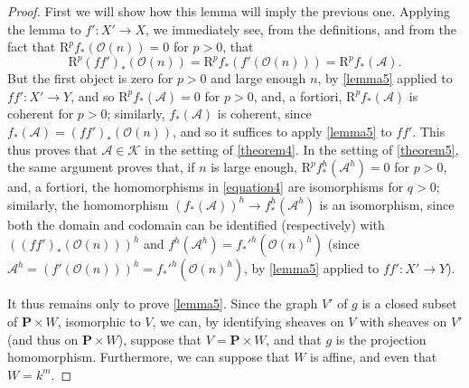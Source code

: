 \documentclass{article}
\theoremstyle{plain}
\theoremstyle{definition}
\newcommand{\sh}{\mathscr}
\newcommand{\cat}{\mathcal}
\newcommand{\RR}{\mathrm{R}}
\newcommand{\oldpage}[1]{\marginpar{\footnotesize$\Big\vert$ \textit{p.~#1}}}
\begin{document}
\begin{proof}
  First we will show how this lemma will imply the previous one.
  Applying the lemma to $f'\colon X'\to X$, we immediately see, from the definitions, and from the fact that $\RR^pf_*(\sh{O}(n))=0$ for $p>0$, that
  \[
    \RR^p(ff')_*(\sh{O}(n)) = \RR^pf_*(f'(\sh{O}(n))) = \RR^pf_*(\sh{A}).
  \]
\oldpage{2-12}
  But the first object is zero for $p>0$ and large enough $n$, by \cref{lemma5} applied to $ff'\colon X'\to Y$, and so $\RR^pf_*(\sh{A})=0$ for $p>0$, and, a fortiori, $\RR^pf_*(\sh{A})$ is coherent for $p>0$;
  similarly, $f_*(\sh{A})$ is coherent, since $f_*(\sh{A})=(ff')_*(\sh{O}(n))$, and so it suffices to apply \cref{lemma5} to $ff'$.
  This thus proves that $\sh{A}\in\cat{K}$ in the setting of \cref{theorem4}.
  In the setting of \cref{theorem5}, the same argument proves that, if $n$ is large enough, $\RR^pf_*^h(\sh{A}^h)=0$ for $p>0$, and, a fortiori, the homomorphisms in \cref{equation4} are isomorphisms for $q>0$;
  similarly, the homomorphism $(f_*(\sh{A}))^h\to f_*^h(\sh{A}^h)$ is an isomorphism, since both the domain and codomain can be identified (respectively) with $((ff')_*(\sh{O}(n)))^h$ and $f^h(\sh{A}^h)=f_*'^h(\sh{O}(n)^h)$ (since $\sh{A}^h=(f'(\sh{O}(n)))^h=f_*'^h(\sh{O}(n)^h)$, by \cref{lemma5} applied to $ff'\colon X'\to Y$).

  It thus remains only to prove \cref{lemma5}.
  Since the graph $V'$ of $g$ is a closed subset of $\mathbf{P}\times W$, isomorphic to $V$, we can, by identifying sheaves on $V$ with sheaves on $V'$ (and thus on $\mathbf{P}\times W$), suppose that $V=\mathbf{P}\times W$, and that $g$ is the projection homomorphism.
  Furthermore, we can suppose that $W$ is affine, and even that $W=k^m$.


\end{proof}
\end{document}
